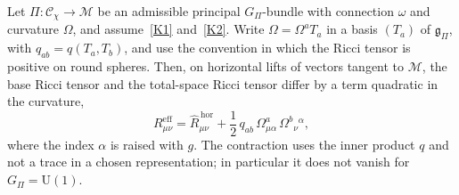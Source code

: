     \begin{proposition}
      \label{prop:fiber-base-curvature}
      Let $\Pi : \mathcal{C}_\chi \to \mathcal{M}$ be an admissible principal $G_\Pi$-bundle with connection $\omega$
      and curvature $\Omega$, and assume~\ref{K1} and~\ref{K2}.
      Write $\Omega = \Omega^a T_a$ in a basis $(T_a)$ of $\mathfrak{g}_\Pi$, with $q_{ab} = q(T_a, T_b)$, and use the
      convention in which the Ricci tensor is positive on round spheres.
      Then, on horizontal lifts of vectors tangent to $\mathcal{M}$, the base Ricci tensor and the total-space Ricci
      tensor differ by a term quadratic in the curvature,
      \begin{equation}
        R^\mathrm{eff}_{\mu\nu}
        =
        \widehat{R}^{\,\mathrm{hor}}_{\mu\nu}
        + \frac{1}{2}\, q_{ab}\,\Omega^a_{\mu\alpha}\,\Omega^b{}_{\nu}{}^{\alpha},
        \label{eq:fiber-to-base-curvature}
      \end{equation}
      where the index $\alpha$ is raised with $g$.
      The contraction uses the inner product $q$ and not a trace in a chosen representation; in particular it does not
      vanish for $G_\Pi = \mathrm{U}(1)$.
    \end{proposition}

